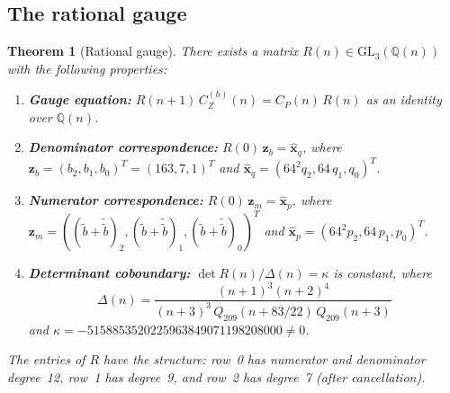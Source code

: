 \documentclass[11pt]{article}
\newtheorem{theorem}{Theorem}
\theoremstyle{remark}
\begin{document}
\subsection{The rational gauge}

\begin{theorem}[Rational gauge]\label{thm:gauge}
There exists a matrix $R(n) \in \mathrm{GL}_3(\mathbb{Q}(n))$
with the following properties:
\begin{enumerate}
\item[\emph{(i)}] \textbf{Gauge equation:}
$R(n{+}1)\,C_Z^{(h)}(n) = C_P(n)\,R(n)$
as an identity over $\mathbb{Q}(n)$.
\item[\emph{(ii)}] \textbf{Denominator correspondence:}
$R(0)\,\mathbf{z}_b = \hat{\mathbf{x}}_q$,
where $\mathbf{z}_b = (b_2,b_1,b_0)^T = (163,7,1)^T$ and
$\hat{\mathbf{x}}_q = (64^2 q_2, 64\,q_1, q_0)^T$.
\item[\emph{(iii)}] \textbf{Numerator correspondence:}
$R(0)\,\mathbf{z}_m = \hat{\mathbf{x}}_p$,
where $\mathbf{z}_m = ((\tilde{b}+\tilde{\tilde{b}})_2,
(\tilde{b}+\tilde{\tilde{b}})_1,
(\tilde{b}+\tilde{\tilde{b}})_0)^T$ and
$\hat{\mathbf{x}}_p = (64^2 p_2, 64\,p_1, p_0)^T$.
\item[\emph{(iv)}] \textbf{Determinant coboundary:}
$\det R(n) / \Delta(n) = \kappa$ is constant, where
\[
\Delta(n) = \frac{(n+1)^3(n+2)^4}{(n+3)^3\,
Q_{209}(n+83/22)\,Q_{209}(n+3)}
\]
and $\kappa = -5158853520225963849071198208000 \neq 0$.
\end{enumerate}
The entries of $R$ have the structure:
row~0 has numerator and denominator degree~12,
row~1 has degree~9, and row~2 has degree~7 (after cancellation).
\end{theorem}
\end{document}
